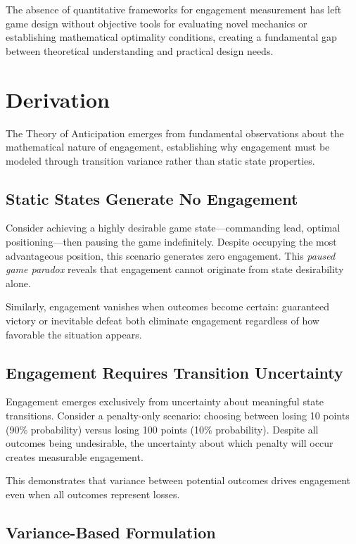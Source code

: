\documentclass{article}
\begin{document}
The absence of quantitative frameworks for engagement measurement has left game design without objective tools for evaluating novel mechanics or establishing mathematical optimality conditions, creating a fundamental gap between theoretical understanding and practical design needs.

\section{Derivation}

The Theory of Anticipation emerges from fundamental observations about the mathematical nature of engagement, establishing why engagement must be modeled through transition variance rather than static state properties.

\subsection{Static States Generate No Engagement}

Consider achieving a highly desirable game state—commanding lead, optimal positioning—then pausing the game indefinitely. Despite occupying the most advantageous position, this scenario generates zero engagement. This \emph{paused game paradox} reveals that engagement cannot originate from state desirability alone.

Similarly, engagement vanishes when outcomes become certain: guaranteed victory or inevitable defeat both eliminate engagement regardless of how favorable the situation appears.

\subsection{Engagement Requires Transition Uncertainty}

Engagement emerges exclusively from uncertainty about meaningful state transitions. Consider a penalty-only scenario: choosing between losing 10 points (90\% probability) versus losing 100 points (10\% probability). Despite all outcomes being undesirable, the uncertainty about which penalty will occur creates measurable engagement.

This demonstrates that variance between potential outcomes drives engagement even when all outcomes represent losses.

\subsection{Variance-Based Formulation}
\end{document}
